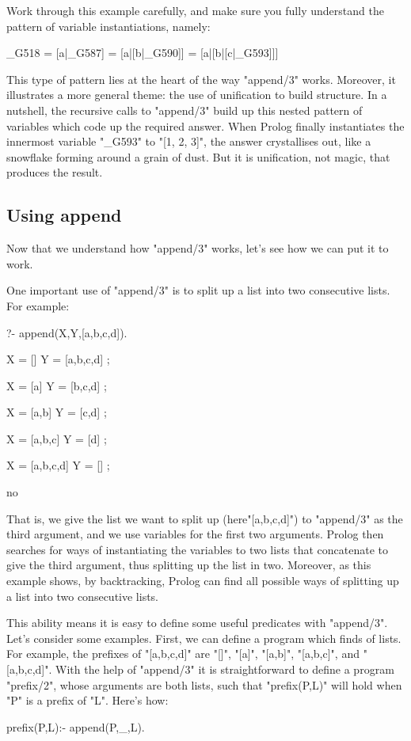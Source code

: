 Work through this example carefully, and make sure you fully
understand the pattern of variable instantiations, namely:
\begin{LPNcodedisplay}
_G518 = [a|_G587]
      = [a|[b|_G590]]
      = [a|[b|[c|_G593]]]
\end{LPNcodedisplay}
This type of pattern lies at the heart of the way "append/3" works.
Moreover, it illustrates a more general theme: the use of unification to
build structure. In a nutshell, the recursive calls to "append/3" build up
this nested pattern of variables which code up the required
answer. When Prolog finally instantiates the innermost variable
"\_G593" to "[1, 2, 3]", the answer crystallises out, like a snowflake
forming around a grain of dust. But it is unification, not magic, that
produces the result.



\subsection*{Using append}\label{SUBSEC.L6.USING.APPEND}



Now that we understand how "append/3" works,
let's see how we can put it to work.

One important use of "append/3" is to split up a list into two
consecutive lists.  For example:
\begin{LPNcodedisplay}
?- append(X,Y,[a,b,c,d]).

X = []
Y = [a,b,c,d] ;

X = [a]
Y = [b,c,d] ;

X = [a,b]
Y = [c,d] ;

X = [a,b,c]
Y = [d] ;

X = [a,b,c,d]
Y = [] ;

no
\end{LPNcodedisplay}

That is, we give the list we want to split up (here"[a,b,c,d]")
to "append/3" as the third argument, and we use variables for the
first two arguments.  Prolog then searches for ways of instantiating
the variables to two lists that concatenate to give the third
argument, thus splitting up the list in two. Moreover, as this example
shows, by backtracking, Prolog can find all possible ways of splitting
up a list into two consecutive lists.

This ability means it is easy to define some useful predicates with
"append/3".  Let's consider some examples.  First, we can define a
program which finds  of lists.  For example, the
prefixes of "[a,b,c,d]" are "[]", "[a]", "[a,b]",
"[a,b,c]", and "[a,b,c,d]".  With the help of "append/3"
it is straightforward to define a program "prefix/2", whose
arguments are both lists, such that "prefix(P,L)" will hold when
"P" is a prefix of "L".  Here's how:
\begin{LPNcodedisplay}
prefix(P,L):- append(P,_,L).
\end{LPNcodedisplay}

